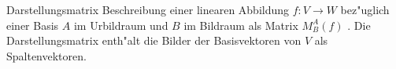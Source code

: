\documentclass[class=article, crop=false]{standalone}
\begin{document}
\begin{zettel}{Darstellungsmatrix}
    Beschreibung einer linearen Abbildung  $f: V \longrightarrow W$ bez"uglich einer Basis $A$ im Urbildraum und $B$ im Bildraum als Matrix $M^{A}_{B} (f)$ .
    Die Darstellungsmatrix enth"alt die Bilder der Basisvektoren von $V$ als Spaltenvektoren.

\end{zettel}
\end{document}
